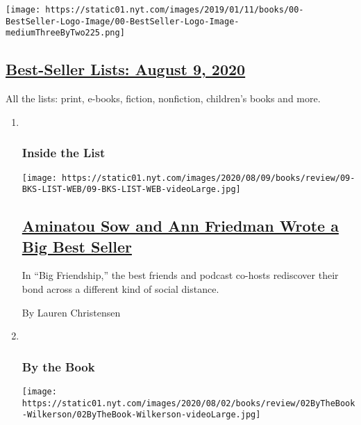 \begin{enumerate}
  \texttt{[image: https://static01.nyt.com/images/2019/01/11/books/00-BestSeller-Logo-Image/00-BestSeller-Logo-Image-mediumThreeByTwo225.png]}

  \hypertarget{best-seller-lists-august-9-2020}{%
  \subsection{\texorpdfstring{\href{/interactive/2020/01/29/books/review/best-sellers-promo-for-front-copy2.html}{Best-Seller
  Lists: August 9,
  2020}}{Best-Seller Lists: August 9, 2020}}\label{best-seller-lists-august-9-2020}}

  All the lists: print, e-books, fiction, nonfiction, children's books
  and more.
\end{enumerate}

\begin{enumerate}
\def\labelenumi{\arabic{enumi}.}
\item ~
  \hypertarget{inside-the-list}{%
  \subsubsection{Inside the List}\label{inside-the-list}}

  \texttt{[image: https://static01.nyt.com/images/2020/08/09/books/review/09-BKS-LIST-WEB/09-BKS-LIST-WEB-videoLarge.jpg]}

  \hypertarget{aminatou-sow-and-ann-friedman-wrote-a-big-best-seller}{%
  \subsection{\texorpdfstring{\href{/2020/07/30/books/review/aminatou-sow-ann-friedman-big-friendship.html}{Aminatou
  Sow and Ann Friedman Wrote a Big Best
  Seller}}{Aminatou Sow and Ann Friedman Wrote a Big Best Seller}}\label{aminatou-sow-and-ann-friedman-wrote-a-big-best-seller}}

  In ``Big Friendship,'' the best friends and podcast co-hosts
  rediscover their bond across a different kind of social distance.

  By Lauren Christensen
\item ~
  \hypertarget{by-the-book}{%
  \subsubsection{By the Book}\label{by-the-book}}

  \texttt{[image: https://static01.nyt.com/images/2020/08/02/books/review/02ByTheBook-Wilkerson/02ByTheBook-Wilkerson-videoLarge.jpg]}


\end{enumerate}
